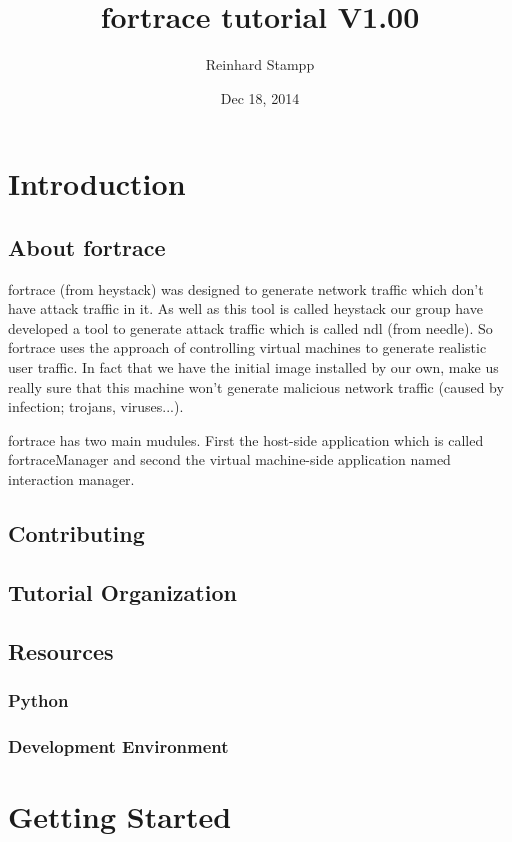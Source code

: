 \documentclass{report}
\title{fortrace tutorial V1.00}
\author{Reinhard Stampp}
\date{Dec 18, 2014}
\begin{document}
  \maketitle
  \tableofcontents
  \chapter{Introduction}
    \section{About fortrace}
    fortrace (from heystack) was designed to generate network traffic which don't have attack traffic in it. As well as this tool is called heystack our group have developed a tool to generate attack traffic which is called ndl (from needle).
    So fortrace uses the approach of controlling virtual machines to generate realistic user traffic. In fact that we have the initial image installed by our own, make us really sure that this machine won't generate malicious network traffic (caused by infection; trojans, viruses...).

    fortrace has two main mudules. First the host-side application which is called fortraceManager and second the virtual machine-side application named interaction manager.
    \section{Contributing}

    \section{Tutorial Organization}

    \section{Resources}
      \subsection{Python}
      \subsection{Development Environment}
    
  \chapter{Getting Started}
\end{document}
